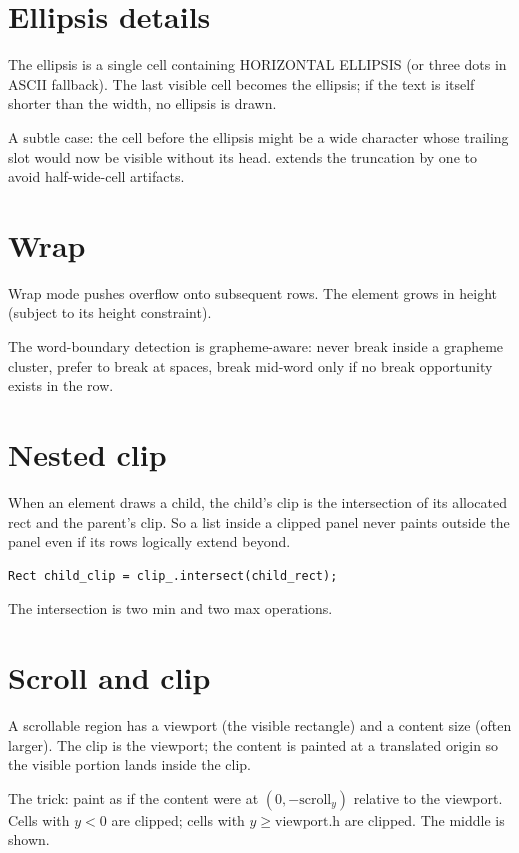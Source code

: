 \section{Ellipsis details}

The ellipsis is a single cell containing 
HORIZONTAL ELLIPSIS (or three dots in ASCII fallback). The
last visible cell becomes the ellipsis; if the text is itself
shorter than the width, no ellipsis is drawn.

A subtle case: the cell before the ellipsis might be a wide
character whose trailing slot would now be visible without
its head. \maya{} extends the truncation by one to avoid
half-wide-cell artifacts.

\section{Wrap}

Wrap mode pushes overflow onto subsequent rows. The element
grows in height (subject to its height constraint).

The word-boundary detection is grapheme-aware: never break
inside a grapheme cluster, prefer to break at spaces, break
mid-word only if no break opportunity exists in the row.

\section{Nested clip}

When an element draws a child, the child's clip is the
intersection of its allocated rect and the parent's clip. So
a list inside a clipped panel never paints outside the panel
even if its rows logically extend beyond.

\begin{lstlisting}
Rect child_clip = clip_.intersect(child_rect);
\end{lstlisting}

The intersection is two min and two max operations.

\section{Scroll and clip}

A scrollable region has a viewport (the visible rectangle) and
a content size (often larger). The clip is the viewport; the
content is painted at a translated origin so the visible
portion lands inside the clip.

The trick: paint as if the content were at $(0, -\text{scroll}_y)$
relative to the viewport. Cells with $y < 0$ are clipped;
cells with $y \geq \text{viewport.h}$ are clipped. The middle
is shown.

